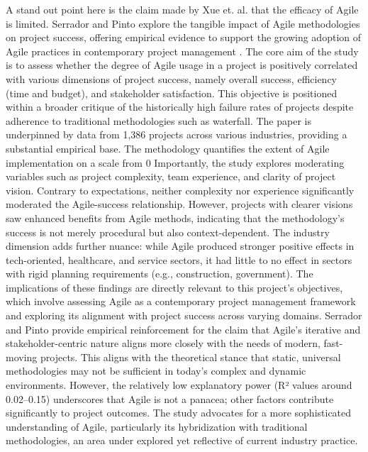 \documentclass{report}
\begin{document}
A stand out point here is the claim made by Xue et. al. that the efficacy of Agile is limited. Serrador and Pinto explore the tangible impact of Agile methodologies on project success, offering empirical evidence to support the growing adoption of Agile practices in contemporary project management \parencite{serradorDoesAgileWork2015}. The core aim of the study is to assess whether the degree of Agile usage in a project is positively correlated with various dimensions of project success, namely overall success, efficiency (time and budget), and stakeholder satisfaction. This objective is positioned within a broader critique of the historically high failure rates of projects despite adherence to traditional methodologies such as waterfall.
The paper is underpinned by data from 1,386 projects across various industries, providing a substantial empirical base. The methodology quantifies the extent of Agile implementation on a scale from 0%
Importantly, the study explores moderating variables such as project complexity, team experience, and clarity of project vision. Contrary to expectations, neither complexity nor experience significantly moderated the Agile-success relationship. However, projects with clearer visions saw enhanced benefits from Agile methods, indicating that the methodology’s success is not merely procedural but also context-dependent. The industry dimension adds further nuance: while Agile produced stronger positive effects in tech-oriented, healthcare, and service sectors, it had little to no effect in sectors with rigid planning requirements (e.g., construction, government).
The implications of these findings are directly relevant to this project’s objectives, which involve assessing Agile as a contemporary project management framework and exploring its alignment with project success across varying domains. Serrador and Pinto provide empirical reinforcement for the claim that Agile’s iterative and stakeholder-centric nature aligns more closely with the needs of modern, fast-moving projects. This aligns with the theoretical stance that static, universal methodologies may not be sufficient in today’s complex and dynamic environments.
However, the relatively low explanatory power (R² values around 0.02–0.15) underscores that Agile is not a panacea; other factors contribute significantly to project outcomes. The study advocates for a more sophisticated understanding of Agile, particularly its hybridization with traditional methodologies, an area under explored yet reflective of current industry practice.
\end{document}
